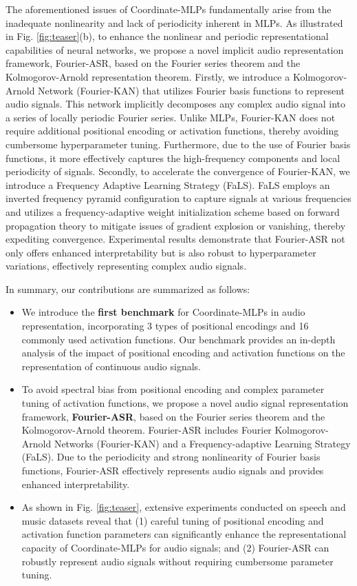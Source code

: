 \documentclass[letterpaper]{article} %
\begin{document}
The aforementioned issues of Coordinate-MLPs fundamentally arise from the inadequate nonlinearity and lack of periodicity inherent in MLPs. As illustrated in Fig. \ref{fig:teaser}(b), to enhance the nonlinear and periodic representational capabilities of neural networks, we propose a novel implicit audio representation framework, Fourier-ASR, based on the Fourier series theorem and the Kolmogorov-Arnold representation theorem. Firstly, we introduce a Kolmogorov-Arnold Network (Fourier-KAN) that utilizes Fourier basis functions to represent audio signals. This network implicitly decomposes any complex audio signal into a series of locally periodic Fourier series. Unlike MLPs, Fourier-KAN does not require additional positional encoding or activation functions, thereby avoiding cumbersome hyperparameter tuning. Furthermore, due to the use of Fourier basis functions, it more effectively captures the high-frequency components and local periodicity of signals. Secondly, to accelerate the convergence of Fourier-KAN, we introduce a Frequency Adaptive Learning Strategy (FaLS). FaLS employs an inverted frequency pyramid configuration to capture signals at various frequencies and utilizes a frequency-adaptive weight initialization scheme based on forward propagation theory to mitigate issues of gradient explosion or vanishing, thereby expediting convergence. Experimental results demonstrate that Fourier-ASR not only offers enhanced interpretability but is also robust to hyperparameter variations, effectively representing complex audio signals.

In summary, our contributions are summarized as follows:
\begin{itemize}
    \item We introduce the \textbf{first benchmark} for Coordinate-MLPs in audio representation, incorporating 3 types of positional encodings and 16 commonly used activation functions. Our benchmark provides an in-depth analysis of the impact of positional encoding and activation functions on the representation of continuous audio signals.
    
     \item To avoid spectral bias from positional encoding and complex parameter tuning of activation functions, we propose a novel audio signal representation framework, \textbf{Fourier-ASR}, based on the Fourier series theorem and the Kolmogorov-Arnold theorem. Fourier-ASR includes Fourier Kolmogorov-Arnold Networks (Fourier-KAN) and a Frequency-adaptive Learning Strategy (FaLS). Due to the periodicity and strong nonlinearity of Fourier basis functions, Fourier-ASR effectively represents audio signals and provides enhanced interpretability.
     
     \item As shown in Fig. \ref{fig:teaser}, extensive experiments conducted on speech and music datasets reveal that (1) careful tuning of positional encoding and activation function parameters can significantly enhance the representational capacity of Coordinate-MLPs for audio signals; and (2) Fourier-ASR can robustly represent audio signals without requiring cumbersome parameter tuning.
 \end{itemize}
\end{document}
